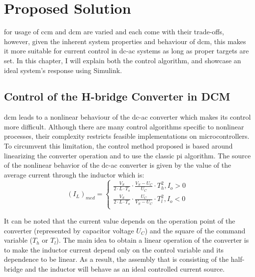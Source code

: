 \chapter{Proposed Solution}
\label{chap:solution}

 for usage of \gls{ccm} and \gls{dcm} are varied and each come with their trade-offs, however, given the inherent system properties and behaviour of \gls{dcm}, this makes it more suitable for current control in \gls{dc}-\gls{ac} systems as long as proper targets are set.
In this chapter, I will explain both the control algorithm, and showcase an ideal system's response using Simulink.

\section{Control of the H-bridge Converter in DCM}
\label{sec:dcmctrl}

\gls{dcm} leads to a nonlinear behaviour of the \gls{dc}-\gls{ac} converter which makes its control more difficult.
Although there are many control algorithms specific to nonlinear processes, their complexity restricts feasible implementations on microcontrollers.
To circumvent this limitation, the control method proposed is based around linearizing the converter operation and to use the classic \gls{pi} algorithm.
The source of the nonlinear behavior of the \gls{dc}-\gls{ac} converter is given by the value of the average current through the inductor which is:
\begin{equation}
    \label{eq:medindcur}
    (I_L)_{med} =  \left\{
        \begin{aligned}
            \frac{V_S}{2 \cdot L \cdot T_o} \cdot \frac{V_S - U_C}{U_C} \cdot T_h^2,   I_o > 0 \\
            \frac{V_S}{2 \cdot L \cdot T_o} \cdot \frac{U_C}{V_S - U_C} \cdot T_l^2,   I_o < 0 \\
        \end{aligned}
    \right.
\end{equation}

It can be noted that the current value depends on the operation point of the converter (represented by capacitor voltage $U_C$) and the square of the command variable ($T_h$ or $T_l$).
The main idea to obtain a linear operation of the converter is to make the inductor current depend only on the control variable and its dependence to be linear.
As a result, the assembly that is consisting of the half-bridge and the inductor will behave as an ideal controlled current source.


